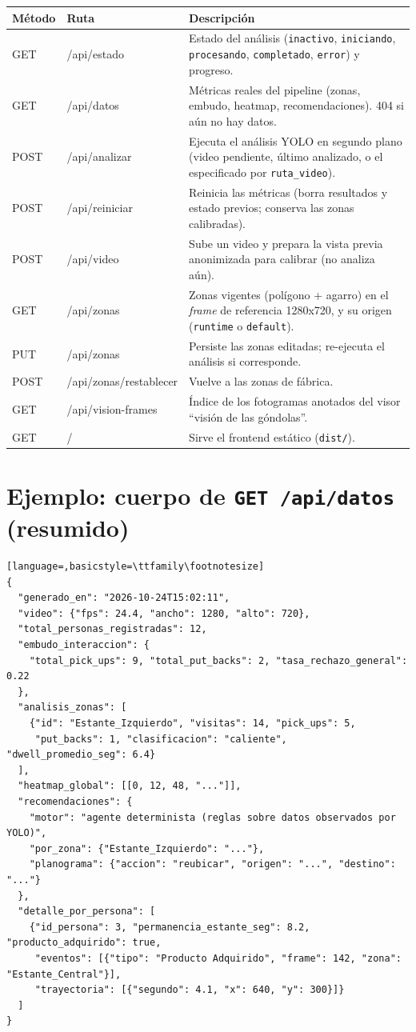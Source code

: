 \documentclass[11pt,a4paper]{report}
\begin{document}
\begin{longtable}{>{\raggedright\arraybackslash}p{1.3cm} >{\ttfamily\raggedright\footnotesize\arraybackslash}p{3.9cm} >{\raggedright\arraybackslash}p{8.6cm}}
\toprule
\rowcolor{rvCodeBg}\textbf{Método} & \textbf{Ruta} & \textbf{Descripción} \\
\midrule
\endhead
GET & /api/estado & Estado del análisis (\texttt{inactivo}, \texttt{iniciando},
\texttt{procesando}, \texttt{completado}, \texttt{error}) y progreso. \\
GET & /api/datos & Métricas reales del pipeline (zonas, embudo, heatmap, recomendaciones). 404 si
aún no hay datos. \\
POST & /api/analizar & Ejecuta el análisis YOLO en segundo plano (video pendiente, último
analizado, o el especificado por \texttt{ruta\_video}). \\
POST & /api/reiniciar & Reinicia las métricas (borra resultados y estado previos; conserva las
zonas calibradas). \\
POST & /api/video & Sube un video y prepara la vista previa anonimizada para calibrar (no analiza
aún). \\
GET & /api/zonas & Zonas vigentes (polígono + agarro) en el \textit{frame} de referencia
1280x720, y su origen (\texttt{runtime} o \texttt{default}). \\
PUT & /api/zonas & Persiste las zonas editadas; re-ejecuta el análisis si corresponde. \\
POST & /api/zonas/restablecer & Vuelve a las zonas de fábrica. \\
GET & /api/vision-frames & Índice de los fotogramas anotados del visor ``visión de las
góndolas''. \\
GET & / & Sirve el frontend estático (\texttt{dist/}). \\
\bottomrule
\end{longtable}

\section{Ejemplo: cuerpo de \texttt{GET /api/datos} (resumido)}

\begin{lstlisting}[language=,basicstyle=\ttfamily\footnotesize]
{
  "generado_en": "2026-10-24T15:02:11",
  "video": {"fps": 24.4, "ancho": 1280, "alto": 720},
  "total_personas_registradas": 12,
  "embudo_interaccion": {
    "total_pick_ups": 9, "total_put_backs": 2, "tasa_rechazo_general": 0.22
  },
  "analisis_zonas": [
    {"id": "Estante_Izquierdo", "visitas": 14, "pick_ups": 5,
     "put_backs": 1, "clasificacion": "caliente", "dwell_promedio_seg": 6.4}
  ],
  "heatmap_global": [[0, 12, 48, "..."]],
  "recomendaciones": {
    "motor": "agente determinista (reglas sobre datos observados por YOLO)",
    "por_zona": {"Estante_Izquierdo": "..."},
    "planograma": {"accion": "reubicar", "origen": "...", "destino": "..."}
  },
  "detalle_por_persona": [
    {"id_persona": 3, "permanencia_estante_seg": 8.2, "producto_adquirido": true,
     "eventos": [{"tipo": "Producto Adquirido", "frame": 142, "zona": "Estante_Central"}],
     "trayectoria": [{"segundo": 4.1, "x": 640, "y": 300}]}
  ]
}
\end{lstlisting}
\end{document}
